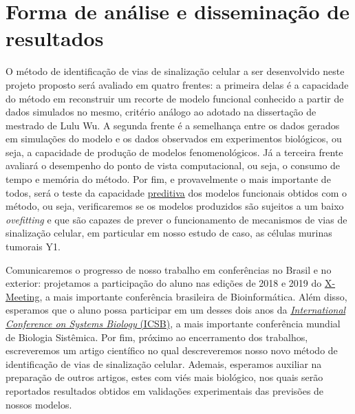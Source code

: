 \documentclass[12pt]{article}
\begin{document}

\section{Forma de análise e disseminação de resultados}

O método de identificação de vias de sinalização celular a ser desenvolvido neste projeto proposto será avaliado em quatro frentes: a primeira delas é a capacidade do método em reconstruir um recorte de modelo funcional conhecido a partir de dados simulados no mesmo, critério análogo ao adotado na dissertação de mestrado de Lulu Wu. A segunda frente é a semelhança entre os dados gerados em simulações do modelo e os dados observados em experimentos biológicos, ou seja, a capacidade de produção de modelos fenomenológicos. Já a terceira frente avaliará o desempenho do ponto de vista computacional, ou seja, o consumo de tempo e memória do método. Por fim, e provavelmente o mais importante de todos, será o teste da capacidade \underline{preditiva} dos modelos funcionais obtidos com o método, ou seja, verificaremos se os modelos produzidos são sujeitos a um baixo {\em ovefitting} e que são capazes de prever o funcionamento de mecanismos de vias de sinalização celular, em particular em nosso estudo de caso, as células murinas tumorais Y1.

Comunicaremos o progresso de nosso trabalho em conferências no Brasil e no exterior: projetamos a participação do aluno nas edições de 2018 e 2019 do \href{http://www.x-meeting.com/events/}{X-Meeting}, a mais importante conferência brasileira de Bioinformática. Além disso, esperamos que o aluno possa participar em um desses dois anos da \href{http://www.cpe.vt.edu/icsb2017/}{{\em International Conference on Systems Biology} (ICSB)}, a mais importante conferência mundial de Biologia Sistêmica. Por fim, próximo ao encerramento dos trabalhos, escreveremos um artigo científico no qual descreveremos nosso novo método de identificação de vias de sinalização celular. Ademais, esperamos auxiliar na preparação de outros artigos, estes com viés mais biológico, nos quais serão reportados resultados obtidos em validações experimentais das previsões de nossos modelos.


 

\end{document}
